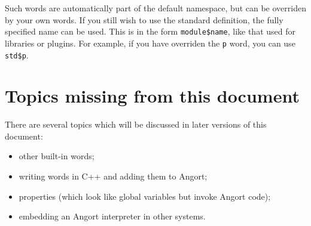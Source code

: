 Such words are automatically part of the default namespace, but can
be overriden by your own words. If you still wish to use the standard
definition, the fully specified name can be used. This is in the form
\verb+module$name+, like that used for libraries or plugins. For example,
if you have overriden the \texttt{p} word, you can use \verb+std$p+.





\section{Topics missing from this document}
There are several topics which will be discussed in later versions
of this document:
\begin{itemize}
\item other built-in words;
\item writing words in C++ and adding them to Angort;
\item properties (which look like global variables but invoke Angort code);
\item embedding an Angort interpreter in other systems.
\end{itemize}




